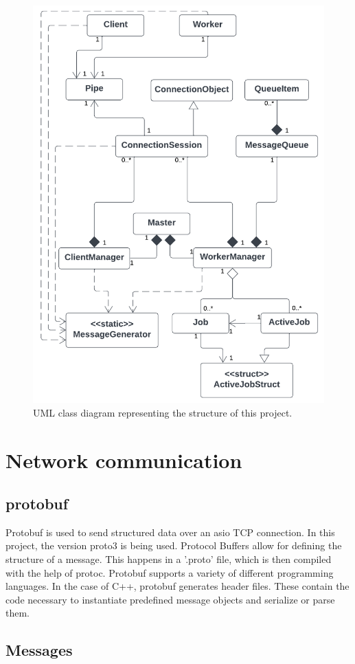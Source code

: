 \documentclass[12pt, letterpaper]{article}
\begin{document}
\begin{figure}[hp]
	\centering
	\includegraphics[width=0.75\linewidth]{img/ClassDiagram}
	\caption{UML class diagram representing the structure of this project.}
	\label{fig:classDiagram}
\end{figure}

\section{Network communication}

\subsection{protobuf}

Protobuf is used to send structured data over an asio TCP connection. In this project, the version proto3 is being used. Protocol Buffers allow for defining the structure of a message. This happens in a '.proto' file, which is then compiled with the help of protoc. Protobuf supports a variety of different programming languages. In the case of C++, protobuf generates header files. These contain the code necessary to instantiate predefined message objects and serialize or parse them.  

\subsection{Messages}
\end{document}
